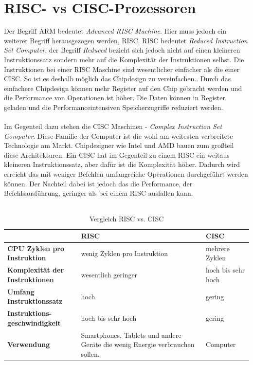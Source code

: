 \section{RISC- vs CISC-Prozessoren}
Der Begriff ARM bedeutet \textit{Advanced RISC Machine}. Hier muss jedoch ein weiterer Begriff herausgezogen werden, RISC. RISC bedeutet \textit{Reduced Instruction Set Computer}, der Begriff \textit{Reduced} bezieht sich jedoch nicht auf einen kleineren Instruktionssatz sondern mehr auf die Komplexit\"at der Instruktionen selbst. Die Instruktionen bei einer RISC Maschine sind wesentlicher einfacher als die einer CISC. So ist es deshalb m\"oglich das Chipdesign zu vereinfachen.. Durch das einfachere Chipdesign k\"onnen mehr Register auf den Chip gebracht werden und die Performance von Operationen ist h\"oher. Die Daten k\"onnen in  Register geladen und die Performanceintensiven Speicherzugriffe reduziert werden.\\\\
Im Gegenteil dazu stehen die CISC Maschinen - \textit{Complex Instruction Set Computer}. Diese Familie der Computer ist die wohl am weitesten verbreitete Technologie am Markt. Chipdesigner wie Intel und AMD bauen zum gro\ss teil diese Architekturen. Ein CISC hat im Gegenteil zu einem RISC ein weitaus kleineren Instruktionssatz, aber daf\"ur ist die Komplexit\"at h\"oher. Dadurch wird erreicht das mit weniger Befehlen umfangreiche Operationen durchgef\"uhrt werden k\"onnen. Der Nachteil dabei ist jedoch das die Performance, der Befehlsausf\"uhrung, geringer als bei einem RISC ausfallen kann.\\\\
\begin{table}[h!]
\begin{tabular}[H]{|p{4cm}|p{6cm}|p{6cm}|}
	\cline{1-3} 
	& \textbf{RISC} & \textbf{CISC} \\ \hline 
	\textbf{CPU Zyklen pro \newline Instruktion} & wenig Zyklen pro Instruktion & mehrere Zyklen \\ \hline
	\textbf{Komplexit\"at der \newline Instruktionen} & wesentlich geringer & hoch bis sehr hoch\\ \hline
	\textbf{Umfang Instruktionssatz} & hoch & gering \\ \hline
	\textbf{Instruktions-\newline geschwindigkeit} &  hoch bis sehr hoch & gering \\ \hline
	\textbf{Verwendung}  & Smartphones, Tablets und andere Ger\"ate die wenig Energie verbrauchen sollen. & Computer \\ \hline	 
	
\end{tabular}
\caption{Vergleich RISC vs. CISC}
\end{table}
